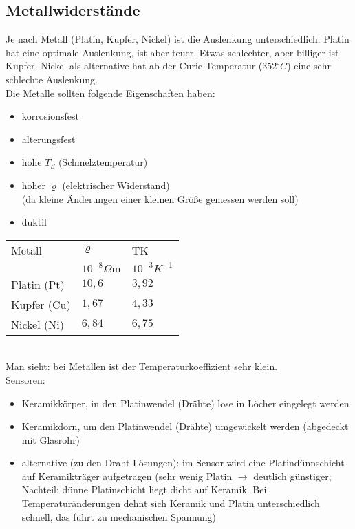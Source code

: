 \documentclass{scrreprt}
\begin{document}
\subsection{Metallwiderstände}
Je nach Metall (Platin, Kupfer, Nickel) ist die Auslenkung unterschiedlich. Platin hat eine optimale Auslenkung, ist aber teuer. Etwas schlechter, aber billiger ist Kupfer. Nickel als alternative hat ab der Curie-Temperatur ($352 ^\circ C$) eine sehr schlechte Auslenkung.\\
Die Metalle sollten folgende Eigenschaften haben:
\begin{itemize}
\item korrosionsfest
\item alterungsfest
\item hohe $T_S$ (Schmelztemperatur)
\item hoher $\varrho$ (elektrischer Widerstand)\\
(da kleine Änderungen einer kleinen Größe gemessen werden soll)
\item duktil
\end{itemize}
\begin{tabular}{l l l}
Metall & $\varrho $ & TK\\
&$ 10^{-8}\Omega \mathrm{m}$&$10^{-3}K^{-1}$\\
\hline
Platin (Pt) & $10,6$ & $3,92$\\
Kupfer (Cu) & $1,67$ & $4,33$\\
Nickel (Ni) & $6,84$ & $6,75$
\end{tabular}\\
Man sieht: bei Metallen ist der Temperaturkoeffizient sehr klein.\\
Sensoren:
\begin{itemize}
\item Keramikkörper, in den Platinwendel (Drähte) lose in Löcher eingelegt werden
\item Keramikdorn, um den Platinwendel (Drähte) umgewickelt werden (abgedeckt mit Glasrohr)
\item alternative (zu den Draht-Lösungen): im Sensor wird eine Platindünnschicht auf Keramikträger aufgetragen (sehr wenig Platin $\to$ deutlich günstiger; Nachteil: dünne Platinschicht liegt dicht auf Keramik. Bei Temperaturänderungen dehnt sich Keramik und Platin unterschiedlich schnell, das führt zu mechanischen Spannung)
\end{itemize}
\end{document}
